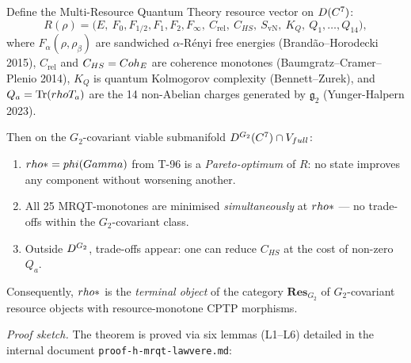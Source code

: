 \begin{theorembox}
\label{thm:t222-mrqt-lawvere}
Define the Multi-Resource Quantum Theory resource vector on
$D(C^7)$:
\[
  R(\rho) = \bigl( E,\ F_0, F_{1/2}, F_1, F_2, F_\infty,\
  C_{\mathrm{rel}},\ C_{HS},\ S_{\mathrm{vN}},\ K_Q,\ Q_1,\ldots,Q_{14} \bigr),
\]
where $F_\alpha(\rho,\rho_\beta)$ are sandwiched $\alpha$-R\'enyi
free energies (Brand\~ao--Horodecki 2015), $C_{\mathrm{rel}}$ and
$C_{HS} = Coh_E$ are coherence monotones (Baumgratz--Cramer--Plenio
2014), $K_Q$ is quantum Kolmogorov complexity (Bennett--Zurek),
and $Q_a = \Tr(rho T_a)$ are the 14 non-Abelian charges generated
by $\mathfrak g_2$ (Yunger-Halpern 2023).

Then on the $G_2$-covariant viable submanifold
$D^{G_2}(C^7) \cap V_{full}$:

\begin{enumerate}[label=\textup{(}\roman*\textup{)},leftmargin=2em,nosep]
  \item $rho* = phi(Gamma)$ from T-96 is a \emph{Pareto-optimum}
        of $R$: no state improves any component without worsening
        another.
  \item All 25 MRQT-monotones are minimised \emph{simultaneously}
        at $rho*$ --- no trade-offs within the $G_2$-covariant
        class.
  \item Outside $D^{G_2}$, trade-offs appear: one can reduce
        $C_{HS}$ at the cost of non-zero $Q_a$.
\end{enumerate}
Consequently, $rho*$ is the \emph{terminal object} of the
category $\mathbf{Res}_{G_2}$ of $G_2$-covariant resource objects
with resource-monotone CPTP morphisms.
\end{theorembox}

\emph{Proof sketch.} The theorem is proved via six lemmas (L1--L6)
detailed in the internal document
\texttt{proof-h-mrqt-lawvere.md}:

